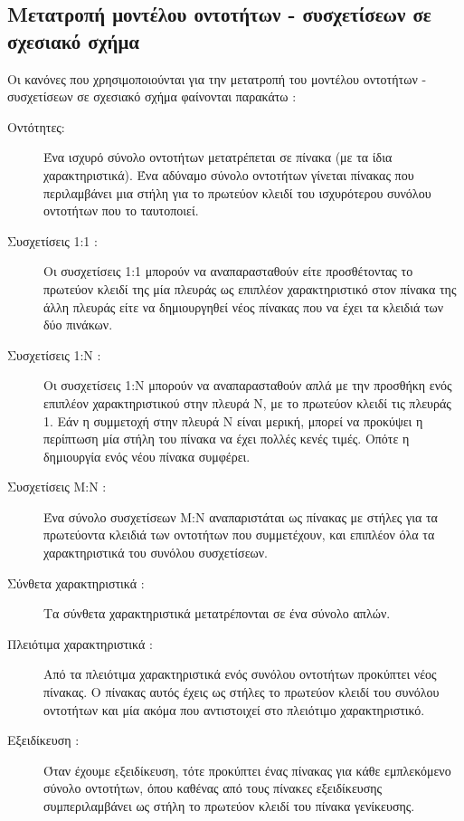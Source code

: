 \documentclass{assignment}
\begin{document}
\subsection{Μετατροπή μοντέλου οντοτήτων - συσχετίσεων σε σχεσιακό σχή\-μα}

Οι κανόνες που χρησιμοποιούνται για την μετατροπή του μοντέλου οντοτήτων - συσχετίσεων σε σχεσιακό σχήμα φαίνονται παρακάτω \cite{class_notes}:

\begin{description}

  \item[Οντότητες:] Ένα ισχυρό σύνολο οντοτήτων μετατρέπεται σε πίνακα (με τα ίδια χαρακτηριστικά). Ένα αδύναμο σύνολο οντοτήτων γίνεται πίνακας που περιλαμβάνει μια στήλη για το πρωτεύον κλειδί του ισχυρότερου συνόλου οντοτήτων που το ταυτοποιεί. 
  \item[Συσχετίσεις 1:1 :] Οι συσχετίσεις 1:1 μπορούν να αναπαρασταθούν είτε προσθέτοντας το πρωτεύον κλειδί της μία πλευράς ως επιπλέον χαρακτηριστικό στον πίνακα της άλλη πλευράς είτε να δημιουργηθεί νέος πίνακας που να έχει τα κλειδιά των δύο πινάκων.
  \item[Συσχετίσεις 1:Ν :] Οι συσχετίσεις 1:Ν μπορούν να αναπαρασταθούν απλά με την προσθήκη ενός επιπλέον χαρακτηριστικού στην πλευρά Ν, με το πρωτεύον κλειδί τις πλευράς 1. Εάν η συμμετοχή στην πλευρά Ν είναι μερική, μπορεί να προκύψει η περίπτωση μία στήλη του πίνακα να έχει πολλές κενές τιμές. Οπότε η δημιουργία ενός νέου πίνακα συμφέρει.
  \item[Συσχετίσεις Μ:Ν :] Ένα σύνολο συσχετίσεων M:N αναπαριστάται ως πίνακας με στήλες για τα πρωτεύοντα κλειδιά των οντοτήτων που συμμετέχουν, και επιπλέον όλα τα χαρακτηριστικά του συνόλου συσχετίσεων. 
  \item[Σύνθετα χαρακτηριστικά :] Τα σύνθετα χαρακτηριστικά μετατρέπονται σε ένα σύνολο απλών.
  \item[Πλειότιμα χαρακτηριστικά :] Από τα πλειότιμα χαρακτηριστικά ενός συνόλου οντοτήτων προκύπτει νέος πίνακας. Ο πίνακας αυτός έχεις ως στήλες το πρωτεύον κλειδί του συνόλου οντοτήτων και μία ακόμα που αντιστοιχεί στο πλειότιμο χαρακτηριστικό.
  \item[Εξειδίκευση :] Όταν έχουμε εξειδίκευση, τότε προκύπτει ένας πίνακας για κάθε εμπλεκόμενο σύνολο οντοτήτων, όπου καθένας από τους πίνακες εξειδίκευσης συμπεριλαμβάνει ως στήλη το πρωτεύον κλειδί του πίνακα γενίκευσης.
 
\end{description}
\end{document}
